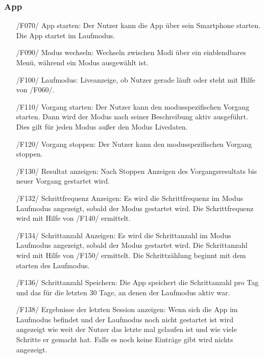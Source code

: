 \documentclass[a4paper,12pt]{article}
\begin{document}
    \subsubsection{App}
      \begin{itemize}
      \item[/F070/] \textsf{App starten:} Der Nutzer kann die App über sein Smartphone starten. Die App startet im Laufmodus.
      \item[/F090/] \textsf{Modus wechseln:} Wechseln zwischen Modi über ein einblendbares Menü, während ein Modus ausgewählt ist.
      \item[/F100/] \textsf{Laufmodus:} Liveanzeige, ob Nutzer gerade \glqq läuft\grqq{} oder \glqq steht\grqq{} mit Hilfe von /F060/.
      \item[/F110/] \textsf{Vorgang starten:} Der Nutzer kann den modusspezifischen \Gls{Vorgang} starten. Dann wird der Modus nach seiner Beschreibung aktiv ausgeführt. Dies gilt für jeden Modus außer den Modus \glqq Livedaten\grqq.%
      \item[/F120/] \textsf{Vorgang stoppen:} Der Nutzer kann den modusspezifischen \Gls{Vorgang} stoppen.%
      \item[/F130/] \textsf{Resultat anzeigen:} Nach Stoppen Anzeigen des Vorgangsresultats bis neuer \Gls{Vorgang} gestartet wird.%
      \item[/F132/] \textsf {Schrittfrequenz Anzeigen:} Es wird die Schrittfrequenz im Modus \glqq{}Laufmodus\grqq{} angezeigt, sobald der Modus gestartet wird. Die Schrittfrequenz wird mit Hilfe von /F140/ ermittelt.
      \item[/F134/] \textsf {Schrittanzahl Anzeigen:} Es wird die Schrittanzahl im Modus \glqq{}Laufmodus\grqq{} angezeigt, sobald der Modus gestartet wird. Die Schrittanzahl wird mit Hilfe von /F150/ ermittelt. Die Schrittzählung beginnt mit dem starten des Laufmodus.
      \item[/F136/] \textsf{Schrittanzahl Speichern:} Die App speichert die Schrittanzahl pro Tag und das für die letzten 30 Tage, an denen der Laufmodus aktiv war.
      \item[/F138/] \textsf{Ergebnisse der letzten Session anzeigen:} Wenn sich die App im Laufmodus befindet und der Laufmodus noch nicht gestartet ist wird angezeigt wie weit der Nutzer das letzte mal gelaufen ist und wie viele Schritte er gemacht hat. Falls es noch keine Einträge gibt wird nichts angezeigt.

\end{itemize}
\end{document}
